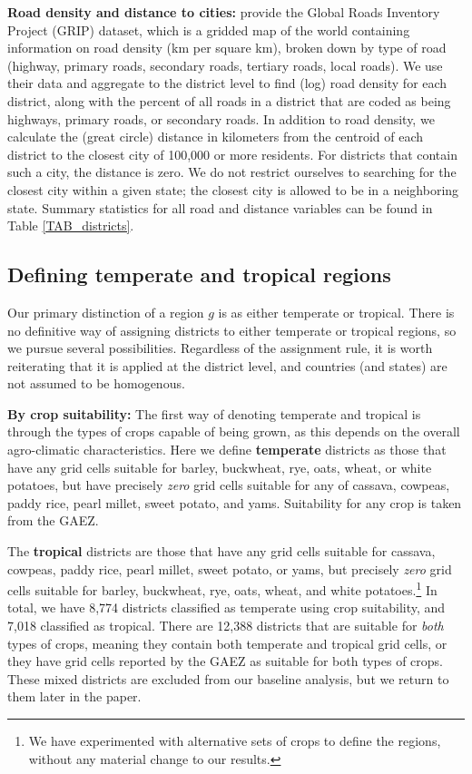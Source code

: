 \documentclass[11pt]{article}
\begin{document}
\vspace{.5cm}\noindent\textbf{Road density and distance to cities:} \citet{GRIPS} provide the Global Roads Inventory Project (GRIP) dataset, which is a gridded map of the world containing information on road density (km per square km), broken down by type of road (highway, primary roads, secondary roads, tertiary roads, local roads). We use their data and aggregate to the district level to find (log) road density for each district, along with the percent of all roads in a district that are coded as being highways, primary roads, or secondary roads. In addition to road density, we calculate the (great circle) distance in kilometers from the centroid of each district to the closest city of 100,000 or more residents. For districts that contain such a city, the distance is zero. We do not restrict ourselves to searching for the closest city within a given state; the closest city is allowed to be in a neighboring state. Summary statistics for all road and distance variables can be found in Table \ref{TAB_districts}. 

\subsection{Defining temperate and tropical regions}
Our primary distinction of a region $g$ is as either temperate or tropical. There is no definitive way of assigning districts to either temperate or tropical regions, so we pursue several possibilities. Regardless of the assignment rule, it is worth reiterating that it is applied at the district level, and countries (and states) are not assumed to be homogenous. 

\vspace{.5cm}\noindent\textbf{By crop suitability:} The first way of denoting temperate and tropical is through the types of crops capable of being grown, as this depends on the overall agro-climatic characteristics. Here we define \textbf{temperate} districts as those that have any grid cells suitable for barley, buckwheat, rye, oats, wheat, or white potatoes, but have precisely \textit{zero} grid cells suitable for any of cassava, cowpeas, paddy rice, pearl millet, sweet potato, and yams. Suitability for any crop is taken from the GAEZ.

The \textbf{tropical} districts are those that have any grid cells suitable for cassava, cowpeas, paddy rice, pearl millet, sweet potato, or yams, but precisely \textit{zero} grid cells suitable for barley, buckwheat, rye, oats, wheat, and white potatoes.\footnote{We have experimented with alternative sets of crops to define the regions, without any material change to our results.} In total, we have 8,774 districts classified as temperate using crop suitability, and 7,018 classified as tropical. There are 12,388 districts that are suitable for \textit{both} types of crops, meaning they contain both temperate and tropical grid cells, or they have grid cells reported by the GAEZ as suitable for both types of crops. These mixed districts are excluded from our baseline analysis, but we return to them later in the paper.
\end{document}
